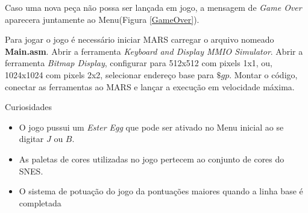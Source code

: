 \documentclass{article}
\begin{document}
Caso uma nova peça não possa ser lançada em jogo, a mensagem de \textit{Game Over} aparecera juntamente ao Menu(Figura \ref{GameOver}).

Para jogar o jogo é necessário iniciar MARS carregar o arquivo nomeado \textbf{Main.asm}. Abrir a ferramenta \textit{Keyboard and Display MMIO Simulator}. Abrir a ferramenta \textit{Bitmap Display}, configurar para 512x512 com pixels 1x1, ou, 1024x1024 com pixels 2x2, selecionar endereço base para $\$gp$. Montar o código, conectar as ferramentas ao MARS e lançar a execução em velocidade máxima.

Curiosidades
\begin{itemize}
  \item O jogo pussui um \textit{Ester Egg} que pode ser ativado no Menu inicial ao se digitar $J$ ou $B$.
  \item As paletas de cores utilizadas no jogo pertecem ao conjunto de cores do SNES.
  \item O sistema de potuação do jogo da pontuações maiores quando a linha base é completada
\end{itemize}
\end{document}
